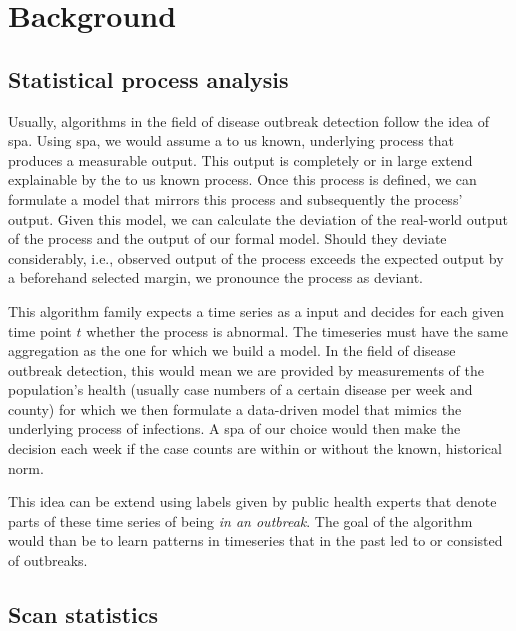 \documentclass[a4paper, 12pt, one column]{article}
\begin{document}
\section{Background}

\subsection{Statistical process analysis}

Usually, algorithms in the field of disease outbreak detection follow the idea of \ac{spa}. Using \ac{spa}, we would assume a to us known, underlying process that produces a measurable output. This output is completely or in large extend explainable by the to us known process. Once this process is defined, we can formulate a model that mirrors this process and subsequently the process' output. Given this model, we can calculate the deviation of the real-world output of the process and the output of our formal model. Should they deviate considerably, i.e., observed output of the process exceeds the expected output by a beforehand selected margin, we pronounce the process as deviant.

This algorithm family expects a time series as a input and decides for each given time point \(t\) whether the process is abnormal. The timeseries must have the same aggregation as the one for which we build a model. In the field of disease outbreak detection, this would mean we are provided by measurements of the population's health (usually case numbers of a certain disease per week and county) for which we then formulate a data-driven model that mimics the underlying process of infections. A \ac{spa} of our choice would then make the decision each week if the case counts are within or without the known, historical norm. 

This idea can be extend using labels given by public health experts that denote parts of these time series of being \emph{in an outbreak}. The goal of the algorithm would than be to learn patterns in timeseries that in the past led to or consisted of outbreaks.

\subsection{Scan statistics}
\end{document}
